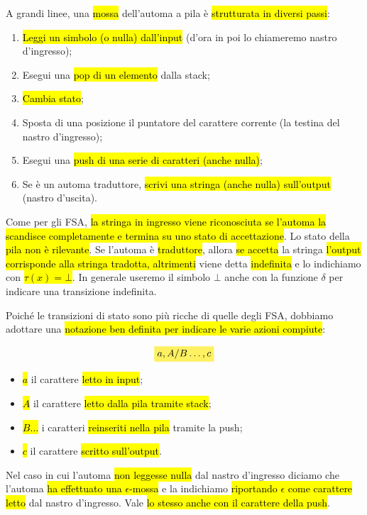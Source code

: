 \documentclass[a4paper,11pt,oneside]{article}
\theoremstyle{plain}
\theoremstyle{definition}
\theoremstyle{remark}
\newcommand{\mhl}[1]{\colorbox{hlcolor}{$\displaystyle #1$}}
\begin{document}
A grandi linee, una \hl{mossa} dell'automa a pila è \hl{strutturata in diversi
passi}:

\begin{enumerate}
  \item \hl{Leggi un simbolo (o nulla) dall'input} (d'ora in poi lo chiameremo
    nastro d'ingresso);
  \item Esegui una \hl{pop di un elemento} dalla stack;
  \item \hl{Cambia stato};
  \item Sposta di una posizione il puntatore del carattere corrente (la testina
    del nastro d'ingresso);
  \item Esegui una \hl{push di una serie di caratteri (anche nulla)};
  \item Se è un automa traduttore, \hl{scrivi una stringa (anche nulla)
    sull'output} (nastro d'uscita).
\end{enumerate}

Come per gli FSA, \hl{la stringa in ingresso viene riconosciuta se l'automa la
scandisce completamente e termina su uno stato di accettazione}. Lo stato della
\hl{pila non è rilevante}. Se l'automa è \hl{traduttore}, allora \hl{se accetta}
la stringa \hl{l'output corrisponde alla stringa tradotta, altrimenti} viene
detta \hl{indefinita} e lo indichiamo con \hl{$\tau(x) = \bot$}. In generale
useremo il simbolo $\bot$ anche con la funzione $\delta$ per indicare una
transizione indefinita.

Poiché le transizioni di stato sono più ricche di quelle degli FSA, dobbiamo
adottare una \hl{notazione ben definita per indicare le varie azioni compiute}:

\begin{equation}
  \mhl{a, A / B\ldots, c}
\end{equation}

\begin{itemize}
  \item \hl{$a$} il carattere \hl{letto in input};
  \item \hl{$A$} il carattere \hl{letto dalla pila tramite stack};
  \item \hl{$B\ldots$} i caratteri \hl{reinseriti nella pila} tramite la push;
  \item \hl{$c$} il carattere \hl{scritto sull'output}.
\end{itemize}

Nel caso in cui l'automa \hl{non leggesse nulla} dal nastro d'ingresso diciamo
che l'automa \hl{ha effettuato una $\epsilon$-mossa} e la indichiamo
\hl{riportando $\epsilon$ come carattere letto} dal nastro d'ingresso. Vale
\hl{lo stesso anche con il carattere della push}.
\end{document}
